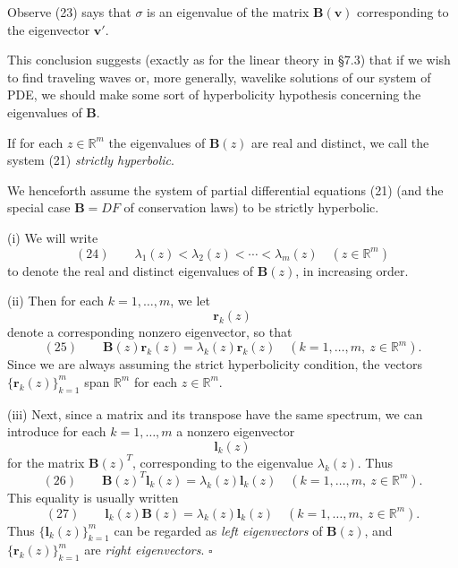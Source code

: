 Observe (23) says that $\sigma$ is an eigenvalue of the matrix $\mathbf{B}(\mathbf{v})$ corresponding to the eigenvector $\mathbf{v}'$.

This conclusion suggests (exactly as for the linear theory in \S7.3) that if we wish to find traveling waves or, more generally, wavelike solutions of our system of PDE, we should make some sort of hyperbolicity hypothesis concerning the eigenvalues of $\mathbf{B}$.

\begin{definition}
\label{def:strictly-hyperbolic-system}
If for each $z\in\mathbb{R}^m$ the eigenvalues of $\mathbf{B}(z)$ are real and distinct, we call the system (21) \textit{strictly hyperbolic}.
\end{definition}

We henceforth assume the system of partial differential equations (21) (and the special case $\mathbf{B}=DF$ of conservation laws) to be strictly hyperbolic.

\begin{definition}
\label{def:eigenvalue-eigenvector-notation-hyperbolic}
(i) We will write
$$(24) \qquad \lambda_1(z) < \lambda_2(z) < \cdots < \lambda_m(z) \quad (z\in\mathbb{R}^m)$$
to denote the real and distinct eigenvalues of $\mathbf{B}(z)$, in increasing order.

(ii) Then for each $k=1,\ldots,m$, we let
$$\mathbf{r}_k(z)$$
denote a corresponding nonzero eigenvector, so that
$$(25) \qquad \mathbf{B}(z)\mathbf{r}_k(z) = \lambda_k(z)\mathbf{r}_k(z) \quad (k=1,\ldots,m,\ z\in\mathbb{R}^m).$$
Since we are always assuming the strict hyperbolicity condition, the vectors $\{\mathbf{r}_k(z)\}_{k=1}^m$ span $\mathbb{R}^m$ for each $z\in\mathbb{R}^m$.

(iii) Next, since a matrix and its transpose have the same spectrum, we can introduce for each $k=1,\ldots,m$ a nonzero eigenvector
$$\mathbf{l}_k(z)$$
for the matrix $\mathbf{B}(z)^T$, corresponding to the eigenvalue $\lambda_k(z)$. Thus
$$(26) \qquad \mathbf{B}(z)^T\mathbf{l}_k(z) = \lambda_k(z)\mathbf{l}_k(z) \quad (k=1,\ldots,m,\ z\in\mathbb{R}^m).$$
This equality is usually written
$$(27) \qquad \mathbf{l}_k(z)\mathbf{B}(z) = \lambda_k(z)\mathbf{l}_k(z) \quad (k=1,\ldots,m,\ z\in\mathbb{R}^m).$$
Thus $\{\mathbf{l}_k(z)\}_{k=1}^m$ can be regarded as \textit{left eigenvectors} of $\mathbf{B}(z)$, and $\{\mathbf{r}_k(z)\}_{k=1}^m$ are \textit{right eigenvectors}. $\square$
\end{definition}

